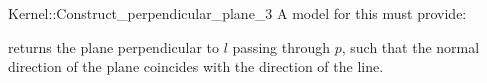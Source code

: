\begin{ccRefFunctionObjectConcept}{Kernel::Construct_perpendicular_plane_3}
A model for this must provide:


{returns the plane perpendicular to $l$ passing through $p$,
such that the normal direction of the plane coincides with the direction of
the line.}

\end{ccRefFunctionObjectConcept}
